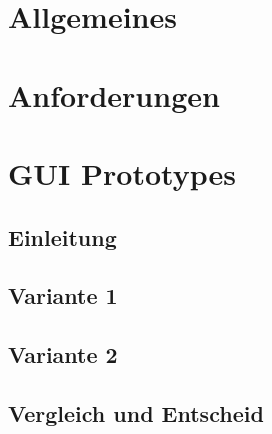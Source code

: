 \documentclass[10pt,a4paper,twoside]{article}
\begin{document}


\setcounter{tocdepth}{5} %
\setcounter{secnumdepth}{5} %
\tableofcontents
\newpage 
\section{Allgemeines}

\section{Anforderungen}

\section{GUI Prototypes}
\subsection{Einleitung}

\subsection{Variante 1}

\newpage
\subsection{Variante 2}

\newpage
\subsection{Vergleich und Entscheid}

\newpage
\appendix
\listoffigures
\listoftables

\newpage
\renewcommand{\refname}{Quellenverzeichnis} 


\end{document}
